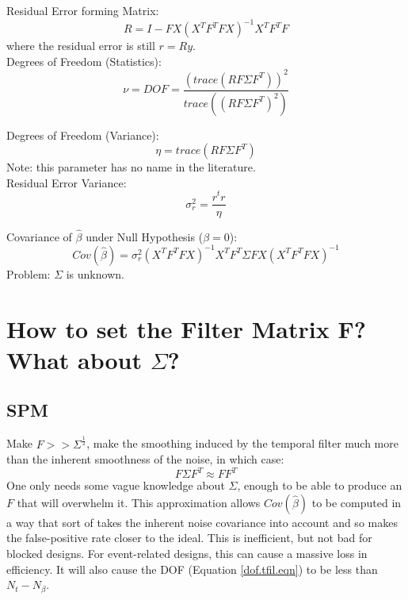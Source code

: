 \documentclass{article}
\begin{document}
\noindent
Residual Error forming Matrix:
\begin{equation}
R = I - F X (X^T F^T F X)^{-1}  X^T F^T  F
\end{equation}
where the residual error is still $r = Ry$.\\

\noindent
Degrees of Freedom (Statistics):
\begin{equation}
\nu = DOF = \frac{(trace(R F \Sigma F^T))^2} {trace((R F \Sigma F^T)^2)}
\label{dof.tfil.eqn}
\end{equation}

\noindent
Degrees of Freedom (Variance):
\begin{equation}
\eta = trace(R F \Sigma F^T)
\end{equation}
Note: this parameter has no name in the literature.\\

\noindent
Residual Error Variance:
\begin{equation}
\sigma_r^2 = \frac{r^t r}{\eta} 
\end{equation}

\noindent
Covariance of $\hat{\beta}$ under Null Hypothesis ($\beta = 0$):
\begin{equation}
Cov(\hat{\beta}) = 
\sigma_r^2 (X^T F^T F X)^{-1}  X^T F^T \Sigma F X (X^T F^T F X)^{-1} 
\end{equation}
Problem: $\Sigma$ is unknown.

\section{How to set the Filter Matrix F? What about $\Sigma$?}

\subsection{SPM}

\noindent
Make $F >> \Sigma^{\frac{1}{2}}$, make the smoothing induced by the
temporal filter much more than the inherent smoothness of the noise,
in which case:
\begin{equation}
F \Sigma F^T \approx F F^T
\end{equation}
One only needs some vague knowledge about $\Sigma$, enough to be able
to produce an $F$ that will overwhelm it.  This approximation allows
$Cov(\hat\beta)$ to be computed in a way that sort of takes the
inherent noise covariance into account and so makes the false-positive
rate closer to the ideal. This is inefficient, but not bad for blocked
designs. For event-related designs, this can cause a massive loss in
efficiency. It will also cause the DOF (Equation \ref{dof.tfil.eqn})
to be less than $N_t - N_\beta$.\\
\end{document}
